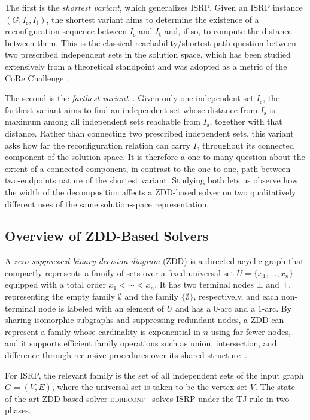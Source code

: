 \documentclass[conference]{IEEEtran}
\newcommand{\ini}{\mathrm{s}}
\newcommand{\tar}{\mathrm{t}}
\begin{document}
The first is the \emph{shortest variant}, which generalizes ISRP.
Given an ISRP instance $(G, I_\ini, I_\tar)$, the shortest variant aims to
determine the existence of a reconfiguration sequence between $I_\ini$ and
$I_\tar$ and, if so, to compute the distance between them. This is the classical
reachability/shortest-path question between two prescribed independent sets in the solution space,
which has been studied extensively from a theoretical standpoint and was adopted
as a metric of the CoRe Challenge~\cite{sotaokit24}.

The second is the \emph{farthest variant}~\cite{ItoKNSSTT23}.
Given only one independent set $I_\ini$, the farthest variant aims to find an
independent set whose distance from $I_\ini$ is maximum among all independent
sets reachable from $I_\ini$, together with that distance. Rather than connecting
two prescribed independent sets, this variant asks how far the reconfiguration
relation can carry $I_\ini$ throughout its connected component of the solution
space. It is therefore a one-to-many question about the extent of a connected
component, in contrast to the one-to-one, path-between-two-endpoints nature of
the shortest variant. Studying both lets us observe how the width of the decomposition affects a
ZDD-based solver on two qualitatively different uses of the same solution-space
representation.

\subsection{Overview of ZDD-Based Solvers}
\label{subsec:zdd_solver}

A \emph{zero-suppressed binary decision diagram} (ZDD) is a directed acyclic
graph that compactly represents a family of sets over a fixed universal set
$U = \{x_1, \dots, x_n\}$ equipped with a total order $x_1 < \cdots < x_n$.
It has two terminal nodes $\bot$ and $\top$, representing the empty family
$\emptyset$ and the family $\{\emptyset\}$, respectively, and each non-terminal
node is labeled with an element of $U$ and has a $0$-arc and a $1$-arc.
By sharing isomorphic subgraphs and suppressing redundant nodes, a ZDD can
represent a family whose cardinality is exponential in $n$ using far fewer
nodes, and it supports efficient family operations such as union,
intersection, and difference through recursive procedures over its shared
structure~\cite{Minato1993,knuth:taocp41}.

For ISRP, the relevant family is the set of all independent sets of the input
graph $G = (V, E)$, where the universal set is taken to be the vertex set $V$.
The state-of-the-art ZDD-based solver \textsc{ddreconf}~\cite{ItoKNSSTT23} solves
ISRP under the TJ rule in two phases.
\end{document}

